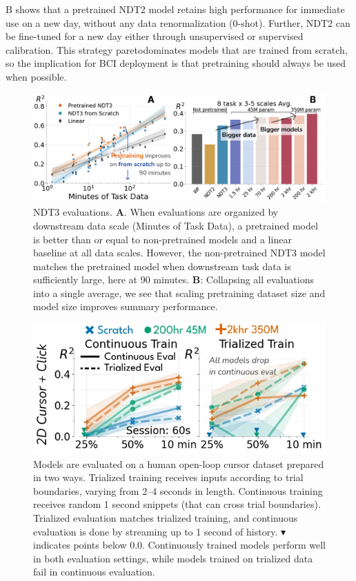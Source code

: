 \documentclass[12pt,oneside]{report}
\begin{document}
B shows that a pretrained NDT2 model retains high performance for immediate use on a new day, without any data renormalization (0-shot). Further, NDT2 can be fine-tuned for a new day either through unsupervised or supervised calibration. This strategy paretodominates models that are trained from scratch, so the implication for BCI deployment is that pretraining should always be used when possible.

\begin{figure}[h]
  \centering
  \includegraphics[width=0.8\linewidth]{ch2_ndt3_summary.png}
  \caption{NDT3 evaluations. \textbf{A}. When evaluations are organized by downstream data scale (Minutes of Task Data), a pretrained model is better than or equal to non-pretrained models and a linear baseline at all data scales. However, the non-pretrained NDT3 model matches the pretrained model when downstream task data is sufficiently large, here at 90 minutes. \textbf{B}: Collapsing all evaluations into a single average, we see that scaling pretraining dataset size and model size improves summary performance.}
  \label{fig:ndt3_summary}
\end{figure}

\begin{figure}[h]
  \centering
  \includegraphics[width=0.8\linewidth]{ch2_trialized.png}
  \caption{Models are evaluated on a human open-loop cursor dataset prepared in two ways.
  Trialized training receives inputs according to trial boundaries, varying from $2$--$4$ seconds in length.
  Continuous training receives random 1 second snippets (that can cross trial boundaries).
  Trialized evaluation matches trialized training, and continuous evaluation is done by streaming up to 1 second of history.
  $\blacktriangledown$ indicates points below 0.0.
  Continuously trained models perform well in both evaluation settings, while models trained on trialized data fail in continuous evaluation.}
  \label{fig:trialized}
\end{figure}
\end{document}
